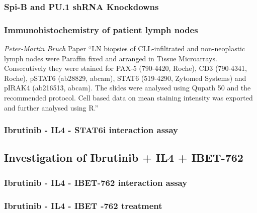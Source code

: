 \documentclass[11pt, a4paper, twosided]{book}
\begin{document}
\hypertarget{spi-b-and-pu.1-shrna-knockdowns}{%
\subsubsection{Spi-B and PU.1 shRNA Knockdowns}\label{spi-b-and-pu.1-shrna-knockdowns}}

\hypertarget{immunohistochemistry-of-patient-lymph-nodes}{%
\subsubsection{Immunohistochemistry of patient lymph nodes}\label{immunohistochemistry-of-patient-lymph-nodes}}

\emph{Peter-Martin Bruch} Paper
``LN biopsies of CLL-infiltrated and non-neoplastic lymph nodes were Paraffin fixed and arranged in Tissue Microarrays. Consecutively they were stained for PAX-5 (790-4420, Roche), CD3 (790-4341, Roche), pSTAT6 (ab28829, abcam), STAT6 (519-4290, Zytomed Systems) and pIRAK4 (ab216513, abcam). The slides were analysed using Qupath 50 and the recommended protocol. Cell based data on mean staining intensity was exported and further analysed using R.''

\hypertarget{ibrutinib---il4---stat6i-interaction-assay}{%
\subsubsection{Ibrutinib - IL4 - STAT6i interaction assay}\label{ibrutinib---il4---stat6i-interaction-assay}}

\hypertarget{investigation-of-ibrutinib-il4-ibet-762}{%
\subsection{Investigation of Ibrutinib + IL4 + IBET-762}\label{investigation-of-ibrutinib-il4-ibet-762}}

\hypertarget{ibrutinib---il4---ibet-762-interaction-assay}{%
\subsubsection{Ibrutinib - IL4 - IBET-762 interaction assay}\label{ibrutinib---il4---ibet-762-interaction-assay}}

\hypertarget{ibrutinib---il4---ibet--762-treatment}{%
\subsubsection{Ibrutinib - IL4 - IBET -762 treatment}\label{ibrutinib---il4---ibet--762-treatment}}
\end{document}
